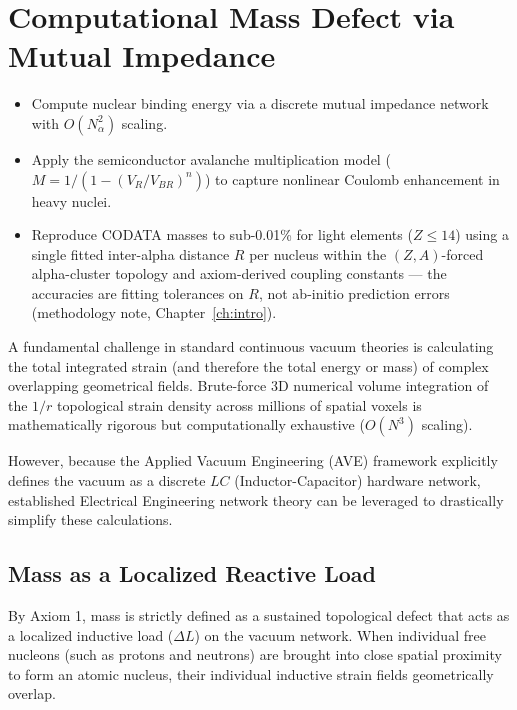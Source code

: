 \chapter{Computational Mass Defect via Mutual Impedance}
\label{ch:computational_mass_defect}


\begin{objectivebox}
\begin{itemize}
    \item Compute nuclear binding energy via a discrete mutual impedance network with $O(N_\alpha^2)$ scaling.
    \item Apply the semiconductor avalanche multiplication model ($M = 1/(1-(V_R/V_{BR})^n)$) to capture nonlinear Coulomb enhancement in heavy nuclei.
    \item Reproduce CODATA masses to sub-0.01\% for light elements ($Z \leq 14$) using a single fitted inter-alpha distance $R$ per nucleus within the $(Z,A)$-forced alpha-cluster topology and axiom-derived coupling constants --- the accuracies are fitting tolerances on $R$, not ab-initio prediction errors (methodology note, Chapter~\ref{ch:intro}).
\end{itemize}
\end{objectivebox}

A fundamental challenge in standard continuous vacuum theories is calculating the total integrated strain (and therefore the total energy or mass) of complex overlapping geometrical fields. Brute-force 3D numerical volume integration of the $1/r$ topological strain density across millions of spatial voxels is mathematically rigorous but computationally exhaustive ($O(N^3)$ scaling). 

However, because the Applied Vacuum Engineering (AVE) framework explicitly defines the vacuum as a discrete $LC$ (Inductor-Capacitor) hardware network, established Electrical Engineering network theory can be leveraged to drastically simplify these calculations.

\section{Mass as a Localized Reactive Load}
By Axiom 1, mass is strictly defined as a sustained topological defect that acts as a localized inductive load ($\Delta L$) on the vacuum network. When individual free nucleons (such as protons and neutrons) are brought into close spatial proximity to form an atomic nucleus, their individual inductive strain fields geometrically overlap.

